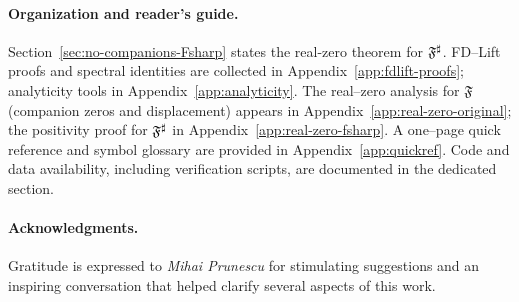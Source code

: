 \paragraph{Organization and reader’s guide.}
Section~\ref{sec:no-companions-Fsharp} states the real-zero theorem for $\mathfrak F^{\sharp}$.
FD–Lift proofs and spectral identities are collected in Appendix~\ref{app:fdlift-proofs}; analyticity tools in Appendix~\ref{app:analyticity}.
The real–zero analysis for $\mathfrak F$ (companion zeros and displacement) appears in Appendix~\ref{app:real-zero-original}; the positivity proof for $\mathfrak F^{\sharp}$ in Appendix~\ref{app:real-zero-fsharp}.
A one–page quick reference and symbol glossary are provided in Appendix~\ref{app:quickref}.
Code and data availability, including verification scripts, are documented in the dedicated section.

\paragraph{Acknowledgments.}
Gratitude is expressed to \emph{Mihai Prunescu} for stimulating suggestions and an inspiring conversation that helped clarify several aspects of this work.

